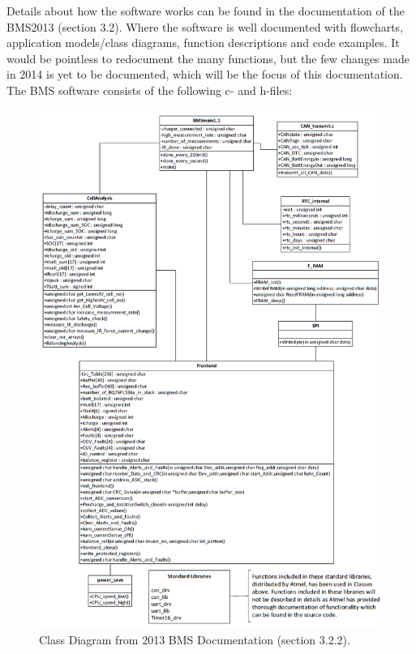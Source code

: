 Details about how the software works can be found in the documentation of the BMS2013 \cite{BMSDocumentation} (section 3.2). Where the software is well documented with flowcharts, application models/class diagrams, function descriptions and code examples. It would be pointless to redocument the many functions, but the few changes made in 2014 is yet to be documented, which will be the focus of this documentation.
The BMS software consists of the following c- and h-files:\\
\begin{figure}[H]
	\centering
	\includegraphics[width=1.0\linewidth]{Software/BMS-ClassDiagram.PNG}
	\caption{Class Diagram from 2013 BMS Documentation \cite{BMSDocumentation} (section 3.2.2).}
	\label{fig:SOFTWARE_BMS}
\end{figure}
